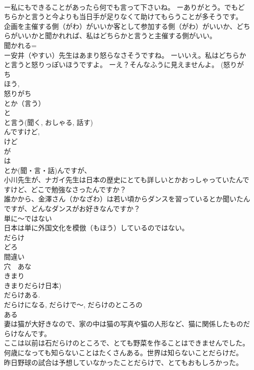 \documentclass[8pt]{extreport}
\begin{document}
\begin{CJK}{UTF8}{min}
\\	ー私にもできることがあったら何でも言って下さいね。 ーありがとう。でもどちらかと言うと今よりも当日手が足りなくて助けてもらうことが多そうです。 
\\	企画を主催する側（がわ）がいいか客として参加する側（がわ）がいいか、どちらがいいかと聞かれれば、私はどちらかと言うと主催する側がいい。 
\\	聞かれる=
\\	ー安井（やすい）先生はあまり怒らなさそうですね。 ーいいえ。私はどちらかと言うと怒りっぽいほうですよ。 ーえ？そんなふうに見えませんよ。 (怒りがち 
\\	ほう, 
\\	怒りがち 
\\	とか（言う）	
\\	と 
\\	と言う(聞く, おしゃる, 話す) 
\\	んですけど, 
\\	けど 
\\	が
\\	は
\\	とか(聞・言・話)んですが、
\\	小川先生が、ナガイ先生は日本の歴史にとても詳しいとかおっしゃっていたんですけど、どこで勉強なさったんですか？ 
\\	誰かから、金澤さん（かなざわ）は若い頃からダンスを習っているとか聞いたんですが、どんなダンスがお好きなんですか？ 
\\	単に～ではない	
\\	日本は単に外国文化を模倣（もほう）しているのではない。 
\\	だらけ	
\\	どろ 
\\	間違い 
\\	穴　あな 
\\	きまり 
\\	きまりだらけ日本) 
\\	だらけある. 
\\	だらけになる, だらけで～, だらけのところの
\\	ある 
\\	妻は猫が大好きなので、家の中は猫の写真や猫の人形など、猫に関係したものだらけなんです。 
\\	ここは以前は石だらけのところで、とても野菜を作ることはできませんでした。 
\\	何歳になっても知らないことはたくさんある。世界は知らないことだらけだ。 
\\	昨日野球の試合は予想していなかったことだらけで、とてもおもしろかった。 

\end{CJK}
\end{document}
